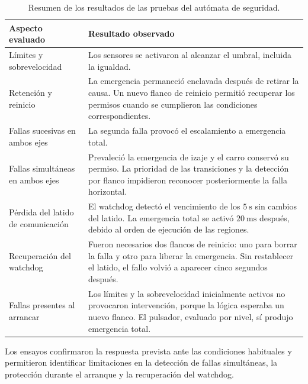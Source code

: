 \begin{table}[!htb]
	\centering
	\small
	\renewcommand{\arraystretch}{1.2}
	\caption{Resumen de los resultados de las pruebas del autómata de seguridad.}
	\label{tab:resumen_pruebas_seguridad}
	\begin{tabular}{L{0.26\textwidth}L{0.66\textwidth}}
		\toprule
		\textbf{Aspecto evaluado} & \textbf{Resultado observado} \\
		\midrule
		
		Límites y sobrevelocidad &
		Los sensores se activaron al alcanzar el umbral, incluida la igualdad. \\
		
		Retención y reinicio &
		La emergencia permaneció enclavada después de retirar la causa. Un nuevo flanco de reinicio permitió recuperar los permisos cuando se cumplieron las condiciones correspondientes. \\
		
		Fallas sucesivas en ambos ejes &
		La segunda falla provocó el escalamiento a emergencia total. \\
		
		Fallas simultáneas en ambos ejes &
		Prevaleció la emergencia de izaje y el carro conservó su permiso. La prioridad de las transiciones y la detección por flanco impidieron reconocer posteriormente la falla horizontal. \\
		
		Pérdida del latido de comunicación &
		El watchdog detectó el vencimiento de los $5~\mathrm{s}$ sin cambios del latido. La emergencia total se activó $20~\mathrm{ms}$ después, debido al orden de ejecución de las regiones. \\
		
		Recuperación del watchdog &
		Fueron necesarios dos flancos de reinicio: uno para borrar la falla y otro para liberar la emergencia. Sin restablecer el latido, el fallo volvió a aparecer cinco segundos después. \\
		
		Fallas presentes al arrancar &
		Los límites y la sobrevelocidad inicialmente activos no provocaron intervención, porque la lógica esperaba un nuevo flanco. El pulsador, evaluado por nivel, sí produjo emergencia total. \\
		
		\bottomrule
	\end{tabular}
\end{table}

Los ensayos confirmaron la respuesta prevista ante las condiciones habituales y permitieron identificar limitaciones en la detección de fallas simultáneas, la protección durante el arranque y la recuperación del watchdog.

\par